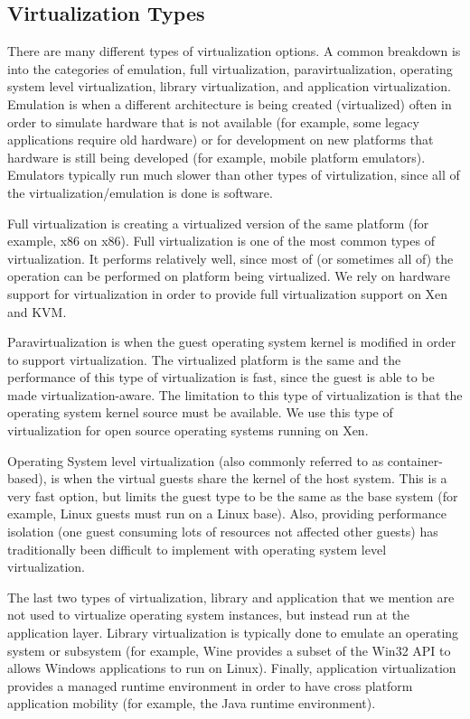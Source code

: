 \subsection{Virtualization Types}
There are many different types of virtualization options. A common breakdown is into the categories of emulation, full virtualization, paravirtualization, operating system level virtualization, library virtualization, and application virtualization. Emulation is when a different architecture is being created (virtualized) often in order to simulate hardware that is not available (for example, some legacy applications require old hardware) or for development on new platforms that hardware is still being developed (for example, mobile platform emulators). Emulators typically run much slower than other types of virtulization, since all of the virtualization/emulation is done is software.

Full virtualization is creating a virtualized version of the same platform (for example, x86 on x86). Full virtualization is one of the most common types of virtualization. It performs relatively well, since most of (or sometimes all of) the operation can be performed on platform being virtualized. We rely on hardware support for virtualization in order to provide full virtualization support on Xen and KVM.

Paravirtualization is when the guest operating system kernel is modified in order to support virtualization. The virtualized platform is the same and the performance of this type of virtualization is fast, since the guest is able to be made virtualization-aware.  The limitation to this type of virtualization is that the operating system kernel source must be available. We use this type of virtualization for open source operating systems running on Xen.

Operating System level virtualization (also commonly referred to as container-based), is when the virtual guests share the kernel of the host system. This is a very fast option, but limits the guest type to be the same as the base system (for example, Linux guests must run on a Linux base). Also, providing performance isolation (one guest consuming lots of resources not affected other guests) has traditionally been difficult to implement with operating system level virtualization. 

The last two types of virtualization, library and application that we mention are not used to virtualize operating system instances, but instead run at the application layer. Library virtualization is typically done to emulate an operating system or subsystem (for example, Wine provides a subset of the Win32 API to allows Windows applications to run on Linux). Finally, application virtualization provides a managed runtime environment in order to have cross platform application mobility (for example, the Java runtime environment).

